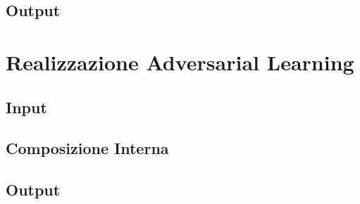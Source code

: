 \subsection{Output}
\label{classificatorennoutput}

\section{Realizzazione Adversarial Learning}
\label{adv}

\subsection{Input}
\label{advinput}

\subsection{Composizione Interna}
\label{advinterno}

\subsection{Output}
\label{advoutput}

